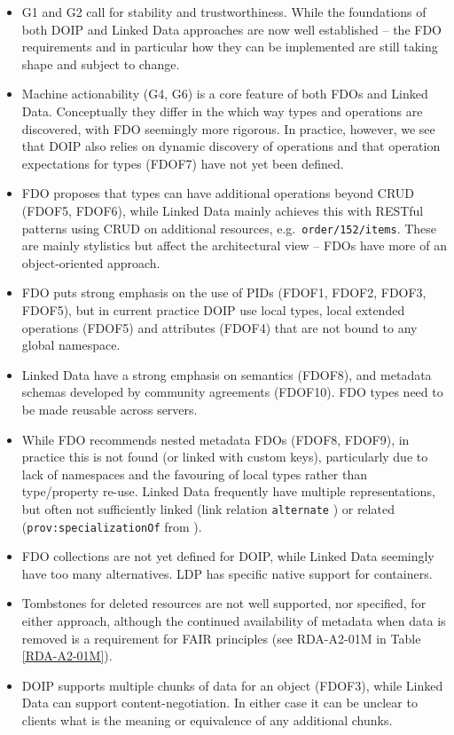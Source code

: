 \documentclass[fleqn,10pt,lineno]{wlpeerjlua}
\providecommand{\tightlist}{%
  \setlength{\itemsep}{0pt}\setlength{\parskip}{0pt}}
\begin{document}
\begin{itemize}
\tightlist
\item
  G1 and G2 call for stability and trustworthiness. While the foundations of both DOIP and Linked Data approaches are now well established -- the FDO requirements and in particular how they can be implemented are still taking shape and subject to change.
\item
  Machine actionability (G4, G6) is a core feature of both FDOs and Linked Data. Conceptually they differ in the which way types and operations are discovered, with FDO seemingly more rigorous. In practice, however, we see that DOIP also relies on dynamic discovery of operations and that operation expectations for types (FDOF7) have not yet been defined.
\item
  FDO proposes that types can have additional operations beyond CRUD (FDOF5, FDOF6), while Linked Data mainly achieves this with RESTful patterns using CRUD on additional resources, e.g.~\texttt{order/152/items}. These are mainly stylistics but affect the architectural view -- FDOs have more of an object-oriented approach.
\item
  FDO puts strong emphasis on the use of PIDs (FDOF1, FDOF2, FDOF3, FDOF5), but in current practice DOIP use local types, local extended operations (FDOF5) and attributes (FDOF4) that are not bound to any global namespace.
\item
  Linked Data have a strong emphasis on semantics (FDOF8), and metadata schemas developed by community agreements (FDOF10). FDO types need to be made reusable across servers.
\item
  While FDO recommends nested metadata FDOs (FDOF8, FDOF9), in practice this is not found (or linked with custom keys), particularly due to lack of namespaces and the favouring of local types rather than type/property re-use. Linked Data frequently have multiple representations, but often not sufficiently linked (link relation \texttt{alternate} \autocite{rfc8288}) or related (\texttt{prov:specializationOf} from \textcite{w3-prov-o}).
\item
  FDO collections are not yet defined for DOIP, while Linked Data seemingly have too many alternatives. LDP has specific native support for containers.
\item
  Tombstones for deleted resources are not well supported, nor specified, for either approach, although the continued availability of metadata when data is removed is a requirement for FAIR principles (see RDA-A2-01M in Table \vref{RDA-A2-01M}).
\item
  DOIP supports multiple chunks of data for an object (FDOF3), while Linked Data can support content-negotiation. In either case it can be unclear to clients what is the meaning or equivalence of any additional chunks.
\end{itemize}
\end{document}
